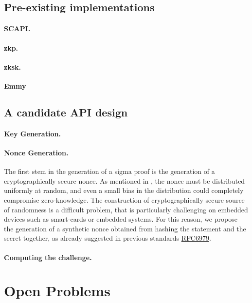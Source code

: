 \documentclass[runningheads]{llncs}
\begin{document}
\subsection{Pre-existing implementations}
\paragraph{SCAPI.}
\paragraph{zkp.}
\paragraph{zksk.}
\paragraph{Emmy}

\subsection{A candidate API design}

\paragraph{Key Generation.}

\paragraph{Nonce Generation.} The first stem in the generation of a sigma proof is the generation of a cryptographically secure nonce. As mentioned in , the nonce must be distributed uniformly at random, and even a small bias in the distribution could completely compromise zero-knowledge.
The construction of cryptographically secure source of randomness is a difficult problem, that is particularly challenging on embedded devices such as smart-cards or embedded systems.
For this reason, we propose the generation of a synthetic nonce obtained from hashing the statement and the secret together, as already suggested in previous standards \href{https://tools.ietf.org/html/rfc6979}{RFC6979}.


\paragraph{Computing the challenge.}

\section{Open Problems}


%
\end{document}
